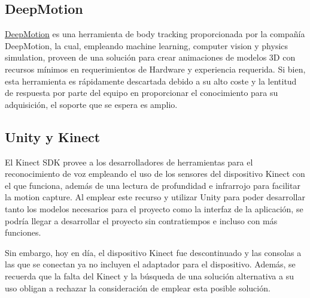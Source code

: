 \subsection{DeepMotion}
\href{https://deepmotion.com/3d-body-tracking}{DeepMotion} es una herramienta de body tracking proporcionada por la compañía DeepMotion, la cual, empleando machine learning, computer vision y physics simulation, proveen de una solución para crear animaciones de modelos 3D con recursos mínimos en requerimientos de Hardware y experiencia requerida. Si bien, esta herramienta es rápidamente descartada debido a su alto coste y la lentitud de respuesta por parte del equipo en proporcionar el conocimiento para su adquisición, el soporte que se espera es amplio.

\subsection{Unity y Kinect}

El Kinect SDK provee a los desarrolladores de herramientas para el reconocimiento de voz empleando el uso de los sensores del dispositivo Kinect con el que funciona, además de una lectura de profundidad e infrarrojo para facilitar la motion capture. Al emplear este recurso y utilizar Unity para poder desarrollar tanto los modelos necesarios para el proyecto como la interfaz de la aplicación, se podría llegar a desarrollar el proyecto sin contratiempos e incluso con más funciones.

Sin embargo, hoy en día, el dispositivo Kinect fue descontinuado y las consolas a las que se conectan ya no incluyen el adaptador para el dispositivo. Además, se recuerda que la falta del Kinect y la búsqueda de una solución alternativa a su uso obligan a rechazar la consideración de emplear esta posible solución.










